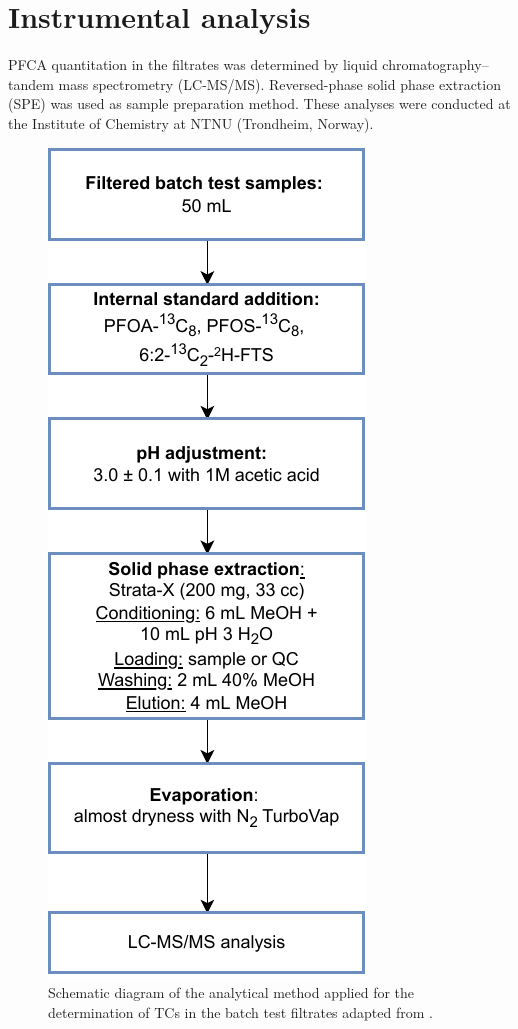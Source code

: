 \section{Instrumental analysis} \label{methods:instrAnalysis}
PFCA quantitation in the filtrates was determined by liquid chromatography--tandem mass spectrometry (LC-MS/MS). Reversed-phase solid phase extraction (SPE) was used as sample preparation method. These analyses were conducted at the Institute of Chemistry at NTNU (Trondheim, Norway).

\begin{figure}
    \centering
    \includegraphics{Diagrams/Methods-Analytical_method.pdf}
    \caption{Schematic diagram of the analytical method applied for the determination of TCs in the batch test filtrates adapted from \cite{arvaniti2012diagram}.}
    \label{fig:analyticalMethod}
\end{figure}


